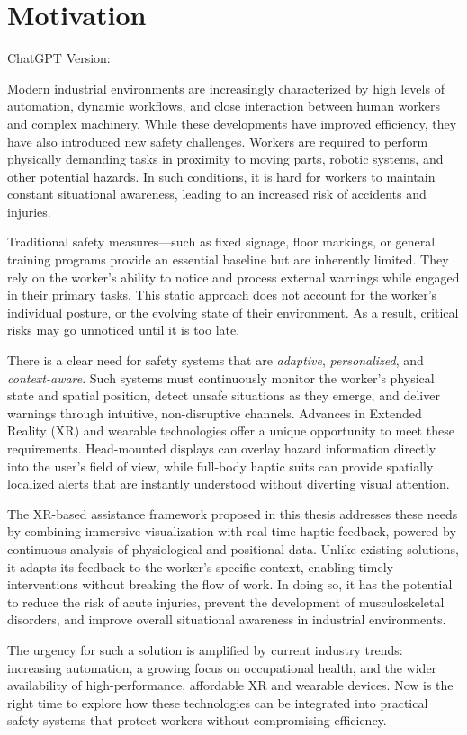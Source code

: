 \chapter{Motivation}
\label{chap:motivation}

ChatGPT Version:

Modern industrial environments are increasingly characterized by high levels of automation, dynamic workflows, and close interaction between human workers and complex machinery. While these developments have improved efficiency, they have also introduced new safety challenges. Workers are required to perform physically demanding tasks in proximity to moving parts, robotic systems, and other potential hazards. In such conditions, it is hard for workers to maintain constant situational awareness, leading to an increased risk of accidents and injuries.

Traditional safety measures—such as fixed signage, floor markings, or general training programs provide an essential baseline but are inherently limited. They rely on the worker’s ability to notice and process external warnings while engaged in their primary tasks. This static approach does not account for the worker’s individual posture, or the evolving state of their environment. As a result, critical risks may go unnoticed until it is too late.

There is a clear need for safety systems that are \textit{adaptive}, \textit{personalized}, and \textit{context-aware}. Such systems must continuously monitor the worker’s physical state and spatial position, detect unsafe situations as they emerge, and deliver warnings through intuitive, non-disruptive channels. Advances in Extended Reality (XR) and wearable technologies offer a unique opportunity to meet these requirements. Head-mounted displays can overlay hazard information directly into the user’s field of view, while full-body haptic suits can provide spatially localized alerts that are instantly understood without diverting visual attention.

The XR-based assistance framework proposed in this thesis addresses these needs by combining immersive visualization with real-time haptic feedback, powered by continuous analysis of physiological and positional data. Unlike existing solutions, it adapts its feedback to the worker’s specific context, enabling timely interventions without breaking the flow of work. In doing so, it has the potential to reduce the risk of acute injuries, prevent the development of musculoskeletal disorders, and improve overall situational awareness in industrial environments.

The urgency for such a solution is amplified by current industry trends: increasing automation, a growing focus on occupational health, and the wider availability of high-performance, affordable XR and wearable devices. Now is the right time to explore how these technologies can be integrated into practical safety systems that protect workers without compromising efficiency.
